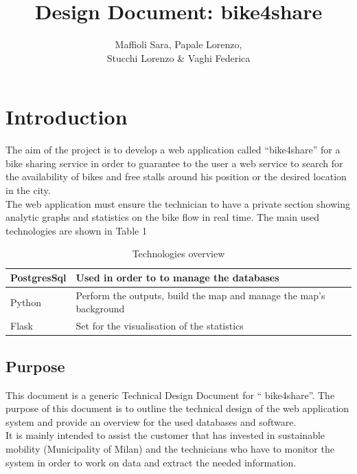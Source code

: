 \documentclass{article}
\title{Design Document: bike4share}
\author{Maffioli Sara, Papale Lorenzo, \\ Stucchi Lorenzo \& Vaghi Federica}
\begin{document}
\maketitle
\tableofcontents

\newpage

\section{Introduction}

The aim of the project is to develop a web application called “bike4share” for a bike sharing service in order to guarantee to the user a web service to search for the availability of bikes and free stalls around his position or the desired location in the city.\\The web application must ensure the technician to have a private section showing analytic graphs and statistics on the bike flow in real time.
The main used technologies are shown in Table 1
\begin{table} [H]
    \begin{center}
        \begin{tabular}{|l|p{}|}
            \hline
            PostgresSql & Used in order to to manage the databases        \\
            \hline
            Python & Perform the outputs, build the map and  manage the map's background 
             \\
            \hline
            Flask &  Set for the visualisation of the statistics
              \\
            \hline
        \end{tabular}
    \end{center}
\caption{Technologies overview }
\end{table}

\subsection{Purpose}
This document is a generic Technical Design Document for “ bike4share”. The purpose of this document is to outline the technical design of the web application system and provide an overview for the used databases and software.\\
It is mainly  intended to assist the customer that has invested in sustainable mobility (Municipality of Milan) and the technicians who have to monitor the system in order to work on data and extract the needed information.
\end{document}

